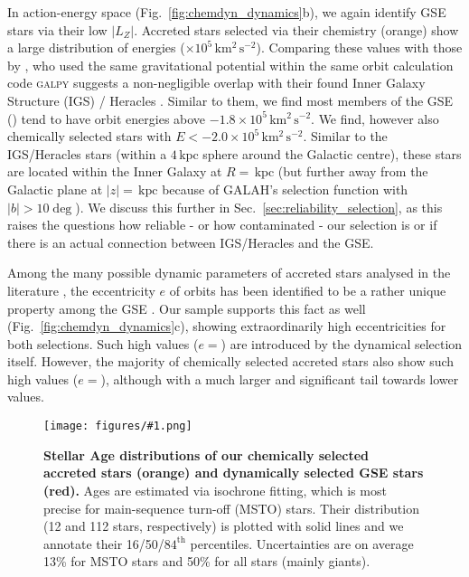 \documentclass[fleqn,usenatbib]{mnras}
\newcommand{\kpc}{\,\mathrm{kpc}}	%
\newcommand{\kmkmss}{\,\mathrm{km^2\,s^{-2}}}	%
\newcommand{\codeicon}{{\faCloudDownload}}
\newcommand{\codelink}[1]{\href{https://github.com/svenbuder/buder_galah_accreted_chemistry/tree/main/figures/#1.ipynb}{\codeicon}\,\,}
\newcommand{\oscaption}[2]{\caption{#2 \codelink{#1}}}
\newcommand{\figurecolumnwidth}[3]{\begin{figure} \centering \texttt{[image: figures/\#1.png]}\oscaption{#2}{#3}\label{fig:#1} \end{figure}}
\begin{document}
In action-energy space (Fig.~\ref{fig:chemdyn_dynamics}b), we again identify GSE stars via their low $\vert L_Z \vert$. Accreted stars selected via their chemistry (orange) show a large distribution of energies ($ \times 10^5 \kmkmss$). Comparing these values with those by \citet{Horta2021}, who used the same gravitational potential \citep{McMillan2017} within the same orbit calculation code \textsc{galpy} \citep{Bovy2015, Mackereth2018} suggests a non-negligible overlap with their found Inner Galaxy Structure (IGS) / Heracles \citep{Horta2021}. Similar to them, we find most members of the GSE () tend to have orbit energies above $-1.8 \times 10^5 \kmkmss$. We find, however also  chemically selected stars with $E < -2.0 \times 10^5 \kmkmss$. Similar to the IGS/Heracles stars (within a $4\kpc$ sphere around the Galactic centre), these stars are located within the Inner Galaxy at $R = $$ \kpc$ (but further away from the Galactic plane at $\vert z \vert =$$\kpc$ because of GALAH's selection function with $\vert b \vert > 10\deg$). We discuss this further in Sec.~\ref{sec:reliability_selection}, as this raises the questions how reliable - or how contaminated - our selection is or if there is an actual connection between IGS/Heracles and the GSE.

Among the many possible dynamic parameters of accreted stars analysed in the literature \citep[e.g.][]{Schuster2012}, the eccentricity $e$ of orbits has been identified to be a rather unique property among the GSE \citep{Mackereth2019, Naidu2020}. Our sample supports this fact as well (Fig.~\ref{fig:chemdyn_dynamics}c), showing extraordinarily high eccentricities for both selections. Such high values ($e=$) are introduced by the dynamical selection itself. However, the majority of chemically selected accreted stars also show such high values ($e=$), although with a much larger and significant tail towards lower values.

\figurecolumnwidth{age_histogram}{stellar_ages}{
\textbf{Stellar Age distributions of our chemically selected accreted stars (orange) and dynamically selected GSE stars (red).} Ages are estimated via isochrone fitting, which is most precise for main-sequence turn-off (MSTO) stars. Their distribution (12 and 112 stars, respectively) is plotted with solid lines and we annotate their 16/50/$84^\text{th}$ percentiles. Uncertainties are on average 13\% for MSTO stars and 50\% for all stars (mainly giants).
}
\end{document}
